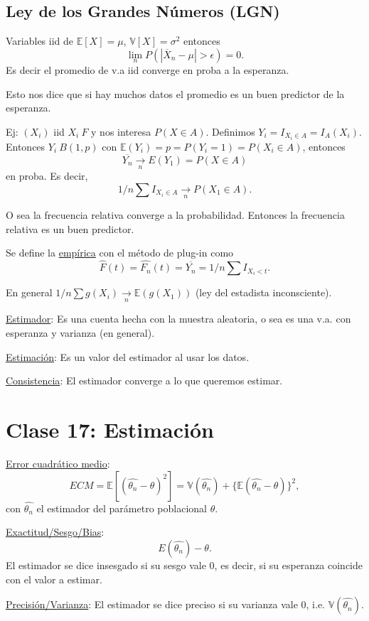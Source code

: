 \documentclass[a4paper,12pt]{article}
\theoremstyle{definition}
\numberwithin{prop}{section}
\theoremstyle{remark}
\numberwithin{ej_subseccion}{subsection}
\begin{document}
	\subsection*{Ley de los Grandes Números (LGN)}
	Variables iid de $\mathbb{E}[X]=\mu$, $\mathbb{V}[X]=\sigma^2$ entonces 
	$$\lim_n P(|\overline{X}_n-\mu|>\epsilon)=0.$$
	Es decir el promedio de v.a iid converge en proba a la esperanza.
	
	Esto nos dice que si hay muchos datos el promedio es un buen predictor de la esperanza.
	
	Ej: $(X_i)$ iid $X_i~F$ y nos interesa $P(X\in A)$. Definimos $Y_i=I_{X_i\in A}=I_A(X_i)$. Entonces $Y_i~B(1,p)$ con $\mathbb{E}(Y_i)=p=P(Y_i=1)=P(X_i\in A)$, entonces 
	$$\overline{Y_n} \xrightarrow[n]{} E(Y_1)=P(X\in A)$$ 
	en proba. Es decir, 
	$$1/n \sum I_{X_i\in A} \xrightarrow[n]{} P(X_1\in A).$$
	
	O sea la frecuencia relativa converge a la probabilidad. Entonces la frecuencia relativa es un buen predictor.

	Se define la \underline{empírica} con el método de plug-in como
	$$\hat{F}(t)=\hat{F_n}(t)=\overline{Y_n}=1/n \sum I_{X_i<t}.$$

	En general $1/n \sum g(X_i) \xrightarrow[n]{} \mathbb{E}(g(X_1))$ (ley del estadista inconsciente).
	
	\underline{Estimador}: Es una cuenta hecha con la muestra aleatoria, o sea es una v.a. con esperanza y varianza (en general).
	
	\underline{Estimación}: Es un valor del estimador al usar los datos.
		
	\underline{Consistencia}: El estimador converge a lo que queremos estimar.

	\section*{Clase 17: Estimación}
	
	\underline{Error cuadrático medio}: $$ECM=\mathbb{E}[(\hat{\theta_n}-\theta)^2]=\mathbb{V}(\hat{\theta_n})+\{\mathbb{E}(\hat{\theta_n}-\theta)\}^2,$$ 
	con $\hat{\theta_n}$ el estimador del parámetro poblacional $\theta$.
		
	\underline{Exactitud/Sesgo/Bias}: 
	$$E(\hat{\theta_n})-\theta.$$ 
	El estimador se dice insesgado si su sesgo vale 0, es decir, si su esperanza coincide con el valor a estimar.
		
	\underline{Precisión/Varianza}: El estimador se dice preciso si su varianza vale 0, i.e. $\mathbb{V}(\hat{\theta_n})$.\\
	
\end{document}
